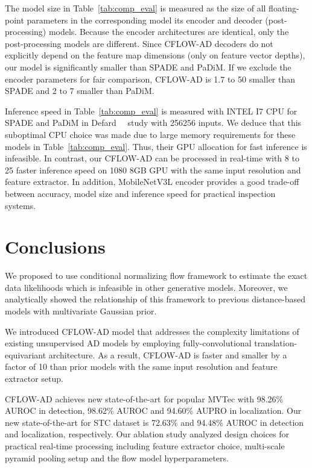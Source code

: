 \documentclass[10pt,twocolumn,letterpaper]{article}
\begin{document}
The model size in Table~\ref{tab:comp_eval} is measured as the size of all floating-point parameters in the corresponding model \ie its encoder and decoder (post-processing) models. Because the encoder architectures are identical, only the post-processing models are different. Since CFLOW-AD decoders do not explicitly depend on the feature map dimensions (only on feature vector depths), our model is significantly smaller than SPADE and PaDiM. If we exclude the encoder parameters for fair comparison, CFLOW-AD is 1.7 to 50 smaller than SPADE and 2 to 7 smaller than PaDiM.

Inference speed in Table~\ref{tab:comp_eval} is measured with INTEL I7 CPU for SPADE and PaDiM in Defard~\etal~\cite{defard2020padim} study with 256256 inputs. We deduce that this suboptimal CPU choice was made due to large memory requirements for these models in Table~\ref{tab:comp_eval}. Thus, their GPU allocation for fast inference is infeasible. In contrast, our CFLOW-AD can be processed in real-time with 8 to 25 faster inference speed on 1080 8GB GPU with the same input resolution and feature extractor. In addition, MobileNetV3L encoder provides a good trade-off between accuracy, model size and inference speed for practical inspection systems.


\section{Conclusions}
\label{sec:conclusion}
We proposed to use conditional normalizing flow framework to estimate the exact data likelihoods which is infeasible in other generative models. Moreover, we analytically showed the relationship of this framework to previous distance-based models with multivariate Gaussian prior.

We introduced CFLOW-AD model that addresses the complexity limitations of existing unsupervised AD models by employing fully-convolutional translation-equivariant architecture. As a result, CFLOW-AD is faster and smaller by a factor of 10 than prior models with the same input resolution and feature extractor setup.

CFLOW-AD achieves new state-of-the-art for popular MVTec with 98.26\% AUROC in detection, 98.62\% AUROC and 94.60\% AUPRO in localization. Our new state-of-the-art for STC dataset is 72.63\% and 94.48\% AUROC in detection and localization, respectively. Our ablation study analyzed design choices for practical real-time processing including feature extractor choice, multi-scale pyramid pooling setup and the flow model hyperparameters.
\end{document}
